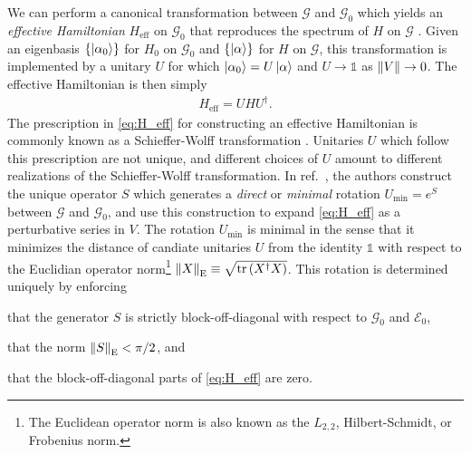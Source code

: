 \documentclass[preprint,showkeys,nofootinbib]{revtex4-1}
\renewcommand{\t}{\text} %
\newcommand{\p}[1]{\left(#1\right)} %
\renewcommand{\set}[1]{\left\{#1\right\}} %
\newcommand{\E}{\mathcal{E}}
\newcommand{\G}{\mathcal{G}}
\newcommand{\1}{\mathds{1}}
\begin{document}
We can perform a canonical transformation between $\G$ and $\G_0$
which yields an {\it effective Hamiltonian} $H_{\t{eff}}$ on $\G_0$
that reproduces the spectrum of $H$ on $\G$
\cite{bravyi2011schrieffer}.  Given an eigenbasis
$\set{\ket{\alpha_0}}$ for $H_0$ on $\G_0$ and $\set{\ket\alpha}$ for
$H$ on $\G$, this transformation is implemented by a unitary $U$ for
which $\ket{\alpha_0}=U\ket\alpha$ and $U\to\1$ as $\norm{V}\to0$.
The effective Hamiltonian is then simply
\begin{align}
  H_{\t{eff}} = U H U^\dag.
  \label{eq:H_eff}
\end{align}
The prescription in \eqref{eq:H_eff} for constructing an effective
Hamiltonian is commonly known as a Schieffer-Wolff transformation
\cite{schrieffer1966relation}.  Unitaries $U$ which follow this
prescription are not unique, and different choices of $U$ amount to
different realizations of the Schieffer-Wolff transformation.  In
ref.~\cite{bravyi2011schrieffer}, the authors construct the unique
operator $S$ which generates a {\it direct} or {\it minimal} rotation
$U_{\t{min}}=e^S$ between $\G$ and $\G_0$, and use this construction
to expand \eqref{eq:H_eff} as a perturbative series in $V$.  The
rotation $U_{\t{min}}$ is minimal in the sense that it minimizes the
distance of candiate unitaries $U$ from the identity $\1$ with respect
to the Euclidian operator norm\footnote{The Euclidean operator norm is
  also known as the $L_{2,2}$, Hilbert-Schmidt, or Frobenius norm.}
$\norm{X}_{\t{E}}\equiv\sqrt{\tr\p{X^\dag X}}$.  This rotation is
determined uniquely by enforcing
\begin{enumerate*}
\item that the generator $S$ is strictly block-off-diagonal with
  respect to $\G_0$ and $\E_0$,
\item that the norm $\norm{S}_{\t{E}}<\pi/2$, and
\item that the block-off-diagonal parts of \eqref{eq:H_eff} are zero.
\end{enumerate*}
\end{document}

